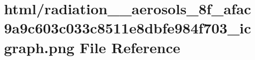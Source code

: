 \hypertarget{radiation____aerosols__8f__afac9a9c603c033c8511e8dbfe984f703__icgraph_8png}{}\section{html/radiation\+\_\+\+\_\+aerosols\+\_\+8f\+\_\+afac9a9c603c033c8511e8dbfe984f703\+\_\+icgraph.png File Reference}
\label{radiation____aerosols__8f__afac9a9c603c033c8511e8dbfe984f703__icgraph_8png}
